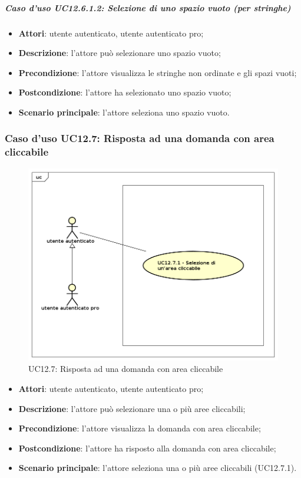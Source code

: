 \subparagraph{Caso d'uso UC12.6.1.2: Selezione di uno spazio vuoto (per stringhe)}
\begin{itemize}
\item \textbf{Attori}: utente autenticato, utente autenticato pro;
\item \textbf{Descrizione}: l'attore può selezionare uno spazio vuoto;
\item \textbf{Precondizione}: l'attore visualizza le stringhe non ordinate e gli spazi vuoti;
\item \textbf{Postcondizione}: l'attore ha selezionato uno spazio vuoto;
\item \textbf{Scenario principale}: l'attore seleziona uno spazio vuoto.
\end{itemize}

\subsubsection{Caso d'uso UC12.7: Risposta ad una domanda con area cliccabile}
\begin{figure}[h]
	\centering
	\includegraphics[scale=0.5]{UML/UC12_7.png}
	\caption{UC12.7: Risposta ad una domanda con area cliccabile}
\end{figure}
\begin{itemize}
\item \textbf{Attori}: utente autenticato, utente autenticato pro;
\item \textbf{Descrizione}: l'attore può selezionare una o più aree cliccabili;
\item \textbf{Precondizione}: l'attore visualizza la domanda con area cliccabile;
\item \textbf{Postcondizione}: l'attore ha risposto alla domanda con area cliccabile;
\item \textbf{Scenario principale}: l'attore seleziona una o più aree cliccabili (UC12.7.1).
\end{itemize}

